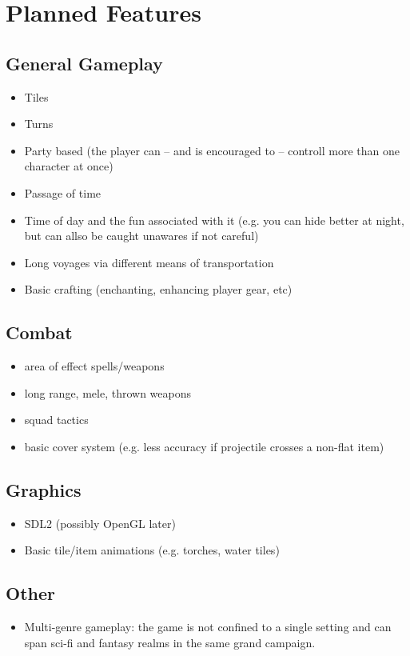 \documentclass[a4paper,10pt]{book}
\begin{document}
\section{Planned Features}
\subsection{General Gameplay}
\begin{itemize}
  \item Tiles
  \item Turns
  \item Party based (the player can -- and is encouraged to -- controll more than one character at once)
  \item Passage of time
  \item Time of day and the fun associated with it (e.g. you can hide better at night, but can allso be caught
    unawares if not careful)
  \item Long voyages via different means of transportation
  \item Basic crafting (enchanting, enhancing player gear, etc)
\end{itemize}

\subsection{Combat}
\begin{itemize}
  \item area of effect spells/weapons
  \item long range, mele, thrown weapons
  \item squad tactics
  \item basic cover system (e.g. less accuracy if projectile crosses a non-flat item)
\end{itemize}

\subsection{Graphics}
\begin{itemize}
  \item SDL2 (possibly OpenGL later)
  \item Basic tile/item animations (e.g. torches, water tiles)
\end{itemize}

\subsection{Other}
\begin{itemize}
  \item Multi-genre gameplay: the game is not confined to a single setting and can span sci-fi and fantasy realms in the same grand campaign.
\end{itemize}
\end{document}
